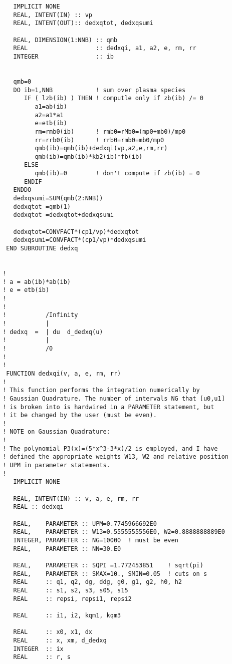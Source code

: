 \documentclass[preprint,12pt,eqsecnum,nofootinbib,amsmath,amssymb]{revtex4}
\begin{document}
{\begin{verbatim}
   IMPLICIT NONE
   REAL, INTENT(IN) :: vp
   REAL, INTENT(OUT):: dedxqtot, dedxqsumi

   REAL, DIMENSION(1:NNB) :: qmb
   REAL                   :: dedxqi, a1, a2, e, rm, rr
   INTEGER                :: ib


   qmb=0
   DO ib=1,NNB            ! sum over plasma species
      IF ( lzb(ib) ) THEN ! computle only if zb(ib) /= 0 
         a1=ab(ib)
         a2=a1*a1
         e=etb(ib)
         rm=rmb0(ib)      ! rmb0=rMb0=(mp0+mb0)/mp0
         rr=rrb0(ib)      ! rrb0=rmb0=mb0/mp0
         qmb(ib)=qmb(ib)+dedxqi(vp,a2,e,rm,rr)
         qmb(ib)=qmb(ib)*kb2(ib)*fb(ib)
      ELSE
         qmb(ib)=0        ! don't compute if zb(ib) = 0
      ENDIF
   ENDDO
   dedxqsumi=SUM(qmb(2:NNB))
   dedxqtot =qmb(1)
   dedxqtot =dedxqtot+dedxqsumi

   dedxqtot=CONVFACT*(cp1/vp)*dedxqtot
   dedxqsumi=CONVFACT*(cp1/vp)*dedxqsumi
 END SUBROUTINE dedxq


!
! a = ab(ib)*ab(ib)
! e = etb(ib)
!
!
!           /Infinity
!           |
! dedxq  =  | du  d_dedxq(u)
!           |
!           /0
!
!
 FUNCTION dedxqi(v, a, e, rm, rr)
!
! This function performs the integration numerically by
! Gaussian Quadrature. The number of intervals NG that [u0,u1]
! is broken into is hardwired in a PARAMETER statement, but 
! it be changed by the user (must be even).
!
! NOTE on Gaussian Quadrature:
!
! The polynomial P3(x)=(5*x^3-3*x)/2 is employed, and I have
! defined the appropriate weights W13, W2 and relative position
! UPM in parameter statements. 
!
   IMPLICIT NONE     
  
   REAL, INTENT(IN) :: v, a, e, rm, rr
   REAL :: dedxqi
  
   REAL,    PARAMETER :: UPM=0.7745966692E0
   REAL,    PARAMETER :: W13=0.5555555556E0, W2=0.8888888889E0
   INTEGER, PARAMETER :: NG=10000  ! must be even
   REAL,    PARAMETER :: NN=30.E0

   REAL,    PARAMETER :: SQPI =1.772453851    ! sqrt(pi)
   REAL,    PARAMETER :: SMAX=10., SMIN=0.05  ! cuts on s
   REAL     :: q1, q2, dg, ddg, g0, g1, g2, h0, h2
   REAL     :: s1, s2, s3, s05, s15 
   REAL     :: repsi, repsi1, repsi2

   REAL     :: i1, i2, kqm1, kqm3

   REAL     :: x0, x1, dx
   REAL     :: x, xm, d_dedxq
   INTEGER  :: ix
   REAL     :: r, s


\end{verbatim}}
\end{document}
